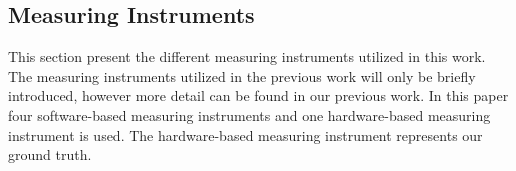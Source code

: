 \subsection{Measuring Instruments}
This section present the different measuring instruments utilized in this work. The measuring instruments utilized in the previous work will only be briefly introduced, however more detail can be found in our previous work\cite{biksbois}. In this paper four software-based measuring instruments and one hardware-based measuring instrument is used. The hardware-based measuring instrument represents our ground truth.



